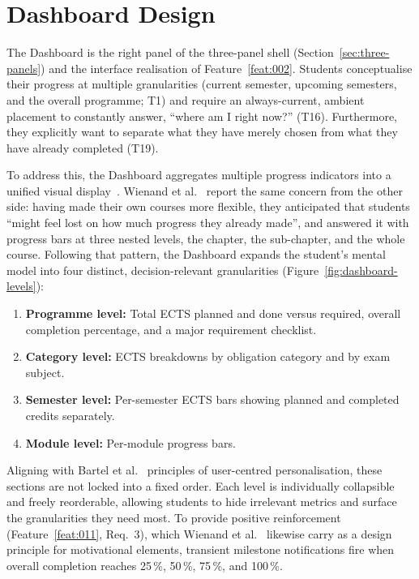\section{Dashboard Design}
\label{sec:dashboard}

The Dashboard is the right panel of the three-panel shell (Section~\ref{sec:three-panels}) and the interface realisation of Feature~\ref{feat:002}. Students conceptualise their progress at multiple granularities (current semester, upcoming semesters, and the overall programme; T1) and require an always-current, ambient placement to constantly answer, \enquote{where am I right now?} (T16). Furthermore, they explicitly want to separate what they have merely chosen from what they have already completed (T19). 

To address this, the Dashboard aggregates multiple progress indicators into a unified visual display~\cite{schwendimann2017}. Wienand et al.~\cite{wienand_design_2024} report the same concern from the other side: having made their own courses more flexible, they anticipated that students \enquote{might feel lost on how much progress they already made}, and answered it with progress bars at three nested levels, the chapter, the sub-chapter, and the whole course. Following that pattern, the Dashboard expands the student's mental model into four distinct, decision-relevant granularities (Figure~\ref{fig:dashboard-levels}):

\begin{enumerate}
  \item \textbf{Programme level:} Total ECTS planned and done versus required, overall completion percentage, and a major requirement checklist.
  \item \textbf{Category level:} ECTS breakdowns by obligation category and by exam subject.
  \item \textbf{Semester level:} Per-semester ECTS bars showing planned and completed credits separately.
  \item \textbf{Module level:} Per-module progress bars.
\end{enumerate}

Aligning with Bartel et al.~\cite{bartel_design_2024} principles of user-centred personalisation, these sections are not locked into a fixed order. Each level is individually collapsible and freely reorderable, allowing students to hide irrelevant metrics and surface the granularities they need most. To provide positive reinforcement (Feature~\ref{feat:011}, Req.~3), which Wienand et al.~\cite{wienand_design_2024} likewise carry as a design principle for motivational elements, transient milestone notifications fire when overall completion reaches 25\,\%, 50\,\%, 75\,\%, and 100\,\%.

